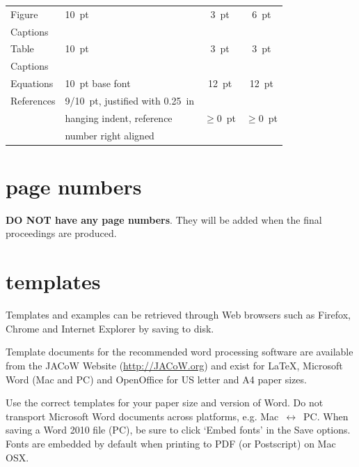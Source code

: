 \documentclass[acus]{jacow}
\begin{document}
\begin{table}[h!t]
\begin{tabular}{@{}llcc@{}}
        \midrule
         Figure        & \SI{10}{pt}                 & \SI{3}{pt}           & \SI{6}{pt}  \\
         Captions      &                             &                 &      \\
        \midrule
         Table         & \SI{10}{pt}                      & \SI{3}{pt}           & \SI{3}{pt}  \\
         Captions      &                             &                 &      \\
        \midrule
         Equations     & \SI{10}{pt} base font            & \SI{12}{pt}          & \SI{12}{pt} \\
        \midrule
         References    & \SI{9/10}{pt}, justified with  \SI{0.25}{in} &      &  \\
                       & hanging indent, reference   & $\ge$\SI{0}{pt} & $\ge$\SI{0}{pt}  \\
                       & number right aligned     &                 &        \\
        \bottomrule
    \end{tabular}
\end{table}

\section{page numbers}

\textbf{DO NOT have any page numbers}. They will be added
when the final proceedings are produced.

\section{templates}

Templates and examples can be retrieved through Web
browsers such as Firefox, Chrome and Internet Explorer by saving to disk.

Template documents for the recommended word processing software are
available from the JACoW Website (\url{http://JACoW.org}) and exist for
\LaTeX, Microsoft Word (Mac and PC) and OpenOffice for US letter and A4 paper sizes.

Use the correct templates for  your paper size and version of Word.
Do not transport Microsoft Word documents across platforms, e.g.
Mac~$\leftrightarrow$~PC. When saving a Word 2010 file (PC), be sure
to click `Embed fonts' in the Save options. Fonts are embedded by default
when printing to PDF (or Postscript) on Mac OSX.
\end{document}
